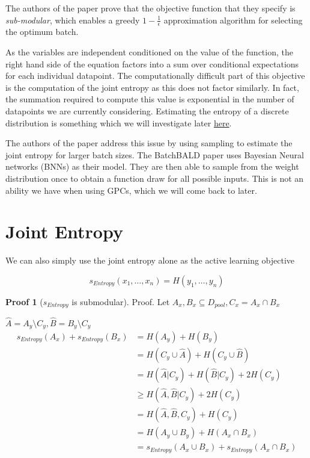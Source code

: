\documentclass[12pt, a4paper]{report}
\theoremstyle{definition}
\theoremstyle{definition}
\theoremstyle{definition}
\newtheorem{nproof}{Proof}[section]
\begin{document}
The authors of the paper prove that the objective function that they specify is \textit{sub-modular}, which enables a greedy $1 - \frac{1}{\epsilon}$ approximation algorithm for selecting the optimum batch.



As the variables are independent conditioned on the value of the function, the right hand side of the equation factors into a sum over conditional expectations for each individual datapoint. The computationally difficult part of this objective is the computation of the joint entropy as this does not factor similarly. In fact, the summation required to compute this value is exponential in the number of datapoints we are currently considering. Estimating the entropy of a discrete distribution is something which we will investigate later \hyperref[sec:Entropy]{here}.


The authors of the paper address this issue by using sampling to estimate the joint entropy for larger batch sizes. The BatchBALD paper uses Bayesian Neural networks (BNNs) as their model. They are then able to sample from the weight distribution once to obtain a function draw for all possible inputs. This is not an ability we have when using GPCs, which we will come back to later.


\section{Joint Entropy}

We can also simply use the joint entropy alone as the active learning objective

$$s_{Entropy} (x_1, \ldots, x_n) = H(y_1, \ldots, y_n)$$

\begin{nproof}[$s_{Entropy}$ is submodular]
    Proof.
    Let $A_x,B_x \subseteq D_{pool}, C_x = A_x \cap B_x$
    
    $\hat{A} = A_y \setminus C_y, \hat{B} = B_y \setminus C_y$
    \begin{align*}
        s_{Entropy} (A_x) + s_{Entropy} (B_x) &= H(A_y) + H(B_y)\\
        &= H(C_y \cup \hat{A}) + H(C_y \cup \hat{B})\\
        &= H(\hat{A} | C_y) + H(\hat{B} | C_y) + 2 H(C_y)\\
        &\geq H(\hat{A}, \hat{B} | C_y) + 2 H(C_y)\\
        &= H(\hat{A}, \hat{B}, C_y) + H(C_y)\\
        &= H(A_y \cup B_y) + H(A_x \cap B_x)\\
        &= s_{Entropy} (A_x \cup B_x) + s_{Entropy} (A_x \cap B_x)
    \end{align*}

\end{nproof}
\end{document}
